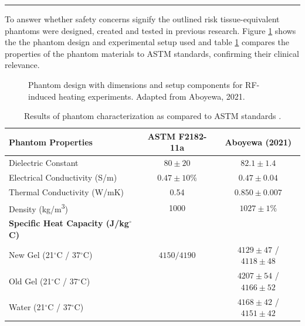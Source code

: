 \documentclass[final]{article}
\newcommand{\posterSection}[1]{
    \noindent{
        \color{DarkBlue}
        \fontsize{50}{60}\bfseries #1
    }
    \vspace{0.5em}
    \hrule
    \vspace{1em}
}
\begin{document}
\begin{multicols}{3}
\vspace{-0.2em} %
\posterSection{Background}
To answer whether safety concerns signify the outlined risk tissue-equivalent phantoms were designed, created and tested in previous research. Figure \ref{fig:phantom_design} shows the the phantom design and experimental setup used and table \ref{tab:phantom_characterization} compares the properties of the phantom materials to ASTM standards, confirming their clinical relevance.

\begin{figure}[H]
    \centering
    
    \caption{Phantom design with dimensions and setup components for RF-induced heating experiments. Adapted from Aboyewa, 2021.\cite{aboyewa2021}}
    \label{fig:phantom_design}
\end{figure}

\begin{table}[H]
    \centering
    \renewcommand{\arraystretch}{1.1} %
    \setlength{\tabcolsep}{5pt} %
    \begin{tabular}{|l|c|c|}
        \hline
        \textbf{Phantom Properties} & \textbf{ASTM F2182-11a} & \textbf{Aboyewa (2021)} \\
        \hline
        Dielectric Constant & $80 \pm 20$ & $82.1 \pm 1.4$ \\
        Electrical Conductivity (S/m) & $0.47 \pm 10\%$ & $0.47 \pm 0.04$ \\
        Thermal Conductivity (W/mK) & 0.54 & $0.850 \pm 0.007$ \\
        Density (kg/m\textsuperscript{3}) & 1000 & $1027 \pm 1\%$ \\
        \hline
        \textbf{Specific Heat Capacity (J/kg$^\circ$C)} & & \\
        New Gel (21$^\circ$C / 37$^\circ$C) & $4150 / 4190$ & $4129 \pm 47$ / $4118 \pm 48$ \\
        Old Gel (21$^\circ$C / 37$^\circ$C) & & $4207 \pm 54$ / $4166 \pm 52$ \\
        Water (21$^\circ$C / 37$^\circ$C) &  & $4168 \pm 42$ / $4151 \pm 42$ \\
        \hline
    \end{tabular}
    \caption{Results of phantom characterization as compared to ASTM standards \cite{aboyewa2021}.}
    \label{tab:phantom_characterization}
\end{table}


\end{multicols}
\end{document}

